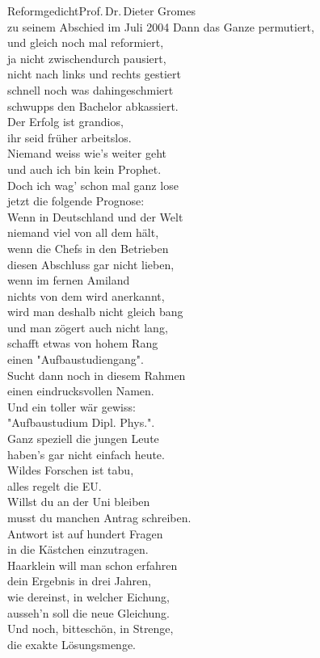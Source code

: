 \begin{lied*}{Reformgedicht}{Prof.\,Dr.\,Dieter Gromes\\zu seinem Abschied im Juli 2004}
Dann das Ganze permutiert,\\
und gleich noch mal reformiert,\\
ja nicht zwischendurch pausiert,\\
nicht nach links und rechts gestiert\\
schnell noch was dahingeschmiert\\
schwupps den Bachelor abkassiert.\\

Der Erfolg ist grandios,\\
ihr seid früher arbeitslos.\\

Niemand weiss wie's weiter geht\\
und auch ich bin kein Prophet.\\
Doch ich wag' schon mal ganz lose\\
jetzt die folgende Prognose:\\

Wenn in Deutschland und der Welt\\
niemand viel von all dem hält,\\
wenn die Chefs in den Betrieben\\
diesen Abschluss gar nicht lieben,\\
wenn im fernen Amiland\\
nichts von dem wird anerkannt,\\
wird man deshalb nicht gleich bang\\
und man zögert auch nicht lang,\\
schafft etwas von hohem Rang\\
einen "Aufbaustudiengang".\\
Sucht dann noch in diesem Rahmen\\
einen eindrucksvollen Namen.\\
Und ein toller wär gewiss:\\
"Aufbaustudium Dipl. Phys.".\\

Ganz speziell die jungen Leute\\
haben's gar nicht einfach heute.\\
Wildes Forschen ist tabu,\\
alles regelt die EU.\\

Willst du an der Uni bleiben\\
musst du manchen Antrag schreiben.\\
Antwort ist auf hundert Fragen\\
in die Kästchen einzutragen.\\
Haarklein will man schon erfahren\\
dein Ergebnis in drei Jahren,\\
wie dereinst, in welcher Eichung,\\
ausseh'n soll die neue Gleichung.\\
Und noch, bitteschön, in Strenge,\\
die exakte Lösungsmenge.\\


\end{lied*}
